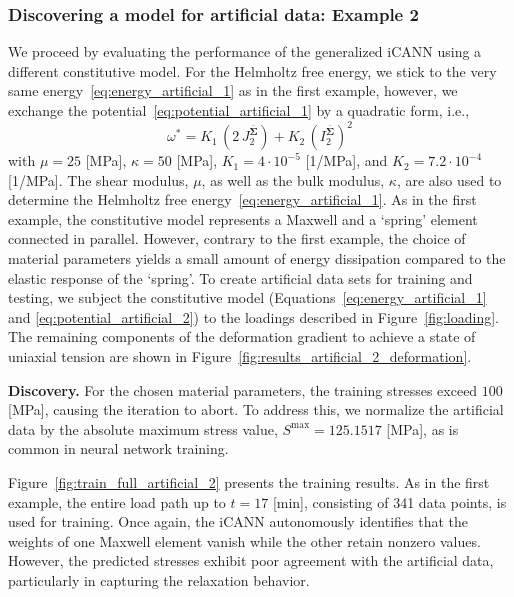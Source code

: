 \subsubsection{Discovering a model for artificial data: Example 2}
\label{sec:results_artificial_2}
%
We proceed by evaluating the performance of the generalized iCANN using a different constitutive model.
For the Helmholtz free energy, we stick to the very same energy~\eqref{eq:energy_artificial_1} as in the first example, however, we exchange the potential~\eqref{eq:potential_artificial_1} by a quadratic form, i.e.,
%
\begin{equation}
    \omega^* = K_1\, \left(2\,J_2^{\bar{\bm{\Sigma}}}\right) + K_2\, \left(I_2^{\bar{\bm{\Sigma}}}\right)^2
\label{eq:potential_artificial_2}
\end{equation}
%
with $\mu=25$ [MPa], $\kappa=50$ [MPa], $K_1=4 \cdot 10^{-5}$ [1/MPa], and $K_2=7.2 \cdot 10^{-4}$ [1/MPa].
The shear modulus, $\mu$, as well as the bulk modulus, $\kappa$, are also used to determine the Helmholtz free energy~\eqref{eq:energy_artificial_1}.
As in the first example, the constitutive model represents a Maxwell and a `spring' element connected in parallel.
However, contrary to the first example, the choice of material parameters yields a small amount of energy dissipation compared to the elastic response of the `spring'.
To create artificial data sets for training and testing, we subject the constitutive model (Equations~\eqref{eq:energy_artificial_1} and \eqref{eq:potential_artificial_2}) to the loadings described in Figure~\ref{fig:loading}.
The remaining components of the deformation gradient to achieve a state of uniaxial tension are shown in Figure~\ref{fig:results_artificial_2_deformation}.\newline

\textbf{Discovery.} For the chosen material parameters, the training stresses exceed $100$ [MPa], causing the iteration to abort. 
To address this, we normalize the artificial data by the absolute maximum stress value, \( S^{\text{max}} = 125.1517 \) [MPa], as is common in neural network training.

Figure~\ref{fig:train_full_artificial_2} presents the training results. 
As in the first example, the entire load path up to \( t = 17 \) [min], consisting of 341 data points, is used for training. 
Once again, the iCANN autonomously identifies that the weights of one Maxwell element vanish while the other retain nonzero values. 
However, the predicted stresses exhibit poor agreement with the artificial data, particularly in capturing the relaxation behavior.

